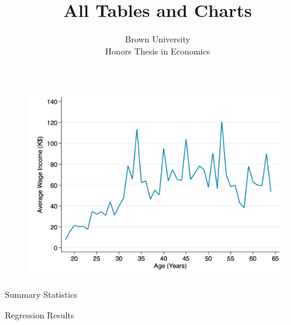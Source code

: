 \documentclass[12pt]{article}
\title{All Tables and Charts}
\subtitle{Brown University\\Honors Thesis in Economics}
\begin{document}
\maketitle


\begin{figure}[ht]
    \centering
    \includegraphics[width=.75\textwidth]{figures/avgwageincome_wage.jpg}
\end{figure}



\begin{table}[ht]
    \centering
    \caption{Summary Statistics}
    
\end{table}



\begin{table}[ht]
    \centering
    \caption{Regression Results}
     
\end{table}
\end{document}
